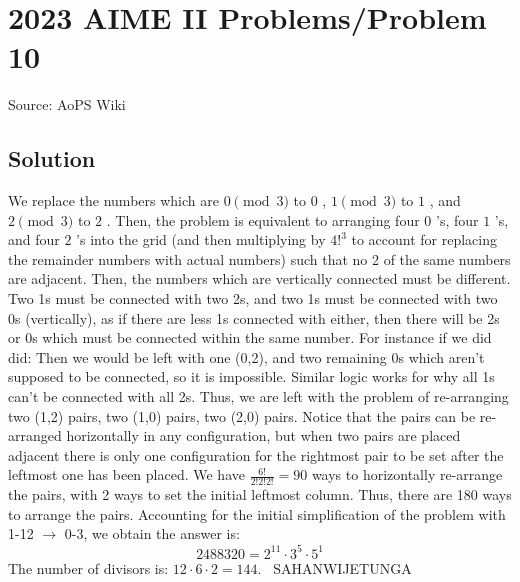 \documentclass[12pt]{article}
\begin{document}
\section*{{2023 AIME II Problems/Problem 10}}
Source: AoPS Wiki

\subsection*{Solution}
We replace the numbers which are $0 \pmod 3$ to $0$ , $1 \pmod 3$ to $1$ , and $2 \pmod 3$ to $2$ . Then, the problem is equivalent to arranging four $0$ 's, four $1$ 's, and four $2$ 's into the grid (and then multiplying by $4!^3$ to account for replacing the remainder numbers with actual numbers) such that no 2 of the same numbers are adjacent. Then, the numbers which are vertically connected must be different. Two 1s must be connected with two 2s, and two 1s must be connected with two 0s (vertically), as if there are less 1s connected with either, then there will be 2s or 0s which must be connected within the same number.
For instance if we did did: Then we would be left with one (0,2), and two remaining 0s which aren't supposed to be connected, so it is impossible. Similar logic works for why all 1s can't be connected with all 2s.
Thus, we are left with the problem of re-arranging two (1,2) pairs, two (1,0) pairs, two (2,0) pairs. Notice that the pairs can be re-arranged horizontally in any configuration, but when two pairs are placed adjacent there is only one configuration for the rightmost pair to be set after the leftmost one has been placed.
We have $\frac{6!}{2!2!2!}=90$ ways to horizontally re-arrange the pairs, with 2 ways to set the initial leftmost column. Thus, there are 180 ways to arrange the pairs. Accounting for the initial simplification of the problem with 1-12 $\rightarrow$ 0-3, we obtain the answer is: \[2488320=2^{11}\cdot3^5\cdot5^1\] The number of divisors is: $12\cdot6\cdot2=\boxed{144}.$ ~SAHANWIJETUNGA
\end{document}
